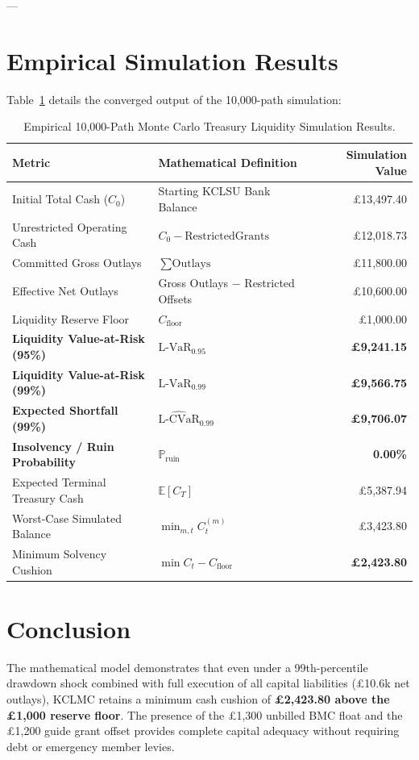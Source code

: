 \documentclass[11pt,a4paper]{article}
\begin{document}
---

\section{Empirical Simulation Results}

Table~\ref{tab:sim_results} details the converged output of the 10,000-path simulation:

\begin{table}[htbp]
\centering
\small
\begin{tabular}{llr}
\toprule
\textbf{Metric} & \textbf{Mathematical Definition} & \textbf{Simulation Value} \\
\midrule
Initial Total Cash ($C_0$)          & Starting KCLSU Bank Balance          & \pounds 13,497.40 \\
Unrestricted Operating Cash         & $C_0 - \text{RestrictedGrants}$       & \pounds 12,018.73 \\
Committed Gross Outlays             & $\sum \text{Outlays}$                 & \pounds 11,800.00 \\
Effective Net Outlays               & Gross Outlays $-$ Restricted Offsets & \pounds 10,600.00 \\
Liquidity Reserve Floor             & $C_{\text{floor}}$                   & \pounds 1,000.00 \\
\midrule
\textbf{Liquidity Value-at-Risk (95\%)} & $\widehat{\text{L-VaR}}_{0.95}$  & \textbf{\pounds 9,241.15} \\
\textbf{Liquidity Value-at-Risk (99\%)} & $\widehat{\text{L-VaR}}_{0.99}$  & \textbf{\pounds 9,566.75} \\
\textbf{Expected Shortfall (99\%)}      & $\widehat{\text{L-CVaR}}_{0.99}$ & \textbf{\pounds 9,706.07} \\
\textbf{Insolvency / Ruin Probability}  & $\mathbb{P}_{\text{ruin}}$       & \textbf{0.00\%} \\
Expected Terminal Treasury Cash         & $\mathbb{E}[C_T]$                & \pounds 5,387.94 \\
Worst-Case Simulated Balance            & $\min_{m, t} C_t^{(m)}$          & \pounds 3,423.80 \\
Minimum Solvency Cushion                & $\min C_t - C_{\text{floor}}$    & \textbf{\pounds 2,423.80} \\
\bottomrule
\end{tabular}
\caption{Empirical 10,000-Path Monte Carlo Treasury Liquidity Simulation Results.}
\label{tab:sim_results}
\end{table}

\section{Conclusion}
The mathematical model demonstrates that even under a 99th-percentile drawdown shock combined with full execution of all capital liabilities (\pounds 10.6k net outlays), KCLMC retains a minimum cash cushion of \textbf{\pounds 2,423.80 above the \pounds 1,000 reserve floor}. The presence of the \pounds 1,300 unbilled BMC float and the \pounds 1,200 guide grant offset provides complete capital adequacy without requiring debt or emergency member levies.
\end{document}
